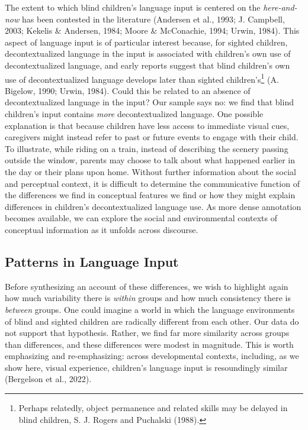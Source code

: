 \documentclass[
  man,floatsintext]{apa6}
\begin{document}
The extent to which blind children's language input is centered on the \emph{here-and-now} has been contested in the literature (Andersen et al., 1993; J. Campbell, 2003; Kekelis \& Andersen, 1984; Moore \& McConachie, 1994; Urwin, 1984). This aspect of language input is of particular interest because, for sighted children, decontextualized language in the input is associated with children's own use of decontextualized language, and early reports suggest that blind children's own use of decontextualized language develops later than sighted children's\footnote{Perhaps relatedly, object permanence and related skills may be delayed in blind children, S. J. Rogers and Puchalski (1988).} (A. Bigelow, 1990; Urwin, 1984). Could this be related to an absence of decontextualized language in the input? Our sample says no: we find that blind children's input contains \emph{more} decontextualized language. One possible explanation is that because children have less access to immediate visual cues, caregivers might instead refer to past or future events to engage with their child. To illustrate, while riding on a train, instead of describing the scenery passing outside the window, parents may choose to talk about what happened earlier in the day or their plans upon home. Without further information about the social and perceptual context, it is difficult to determine the communicative function of the differences we find in conceptual features we find or how they might explain differences in children's decontextualized language use. As more dense annotation becomes available, we can explore the social and environmental contexts of conceptual information as it unfolds across discourse.

\hypertarget{patterns-in-language-input}{%
\subsection{Patterns in Language Input}\label{patterns-in-language-input}}

Before synthesizing an account of these differences, we wish to highlight again how much variability there is \emph{within} groups and how much consistency there is \emph{between} groups. One could imagine a world in which the language environments of blind and sighted children are radically different from each other. Our data do not support that hypothesis. Rather, we find far more similarity across groups than differences, and these differences were modest in magnitude. This is worth emphasizing and re-emphasizing: across developmental contexts, including, as we show here, visual experience, children's language input is resoundingly similar (Bergelson et al., 2022).
\end{document}
